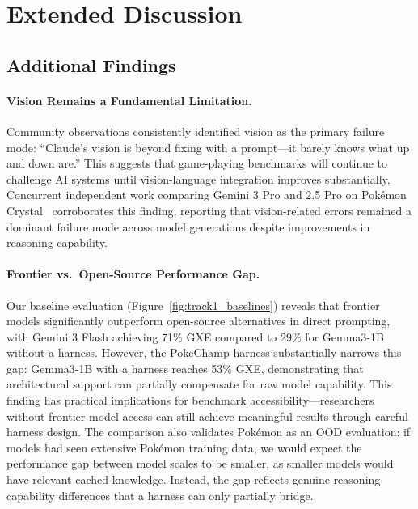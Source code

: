 \section{Extended Discussion}
\label{sec:extended-discussion}

\subsection{Additional Findings}

\paragraph{Vision Remains a Fundamental Limitation.} Community observations consistently identified vision as the primary failure mode: ``Claude's vision is beyond fixing with a prompt---it barely knows what up and down are.'' This suggests that game-playing benchmarks will continue to challenge AI systems until vision-language integration improves substantially. Concurrent independent work comparing Gemini 3 Pro and 2.5 Pro on Pokémon Crystal~\citep{zhang2025gemini3playspokemon} corroborates this finding, reporting that vision-related errors remained a dominant failure mode across model generations despite improvements in reasoning capability.

\paragraph{Frontier vs.\ Open-Source Performance Gap.} Our baseline evaluation (Figure~\ref{fig:track1_baselines}) reveals that frontier models significantly outperform open-source alternatives in direct prompting, with Gemini 3 Flash achieving 71\% GXE compared to 29\% for Gemma3-1B without a harness. However, the PokeChamp harness substantially narrows this gap: Gemma3-1B with a harness reaches 53\% GXE, demonstrating that architectural support can partially compensate for raw model capability. This finding has practical implications for benchmark accessibility---researchers without frontier model access can still achieve meaningful results through careful harness design. The comparison also validates Pokémon as an OOD evaluation: if models had seen extensive Pokémon training data, we would expect the performance gap between model scales to be smaller, as smaller models would have relevant cached knowledge. Instead, the gap reflects genuine reasoning capability differences that a harness can only partially bridge.

